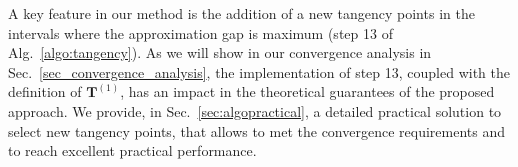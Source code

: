 \documentclass[review]{elsarticle}
\newcommand{\Ic}{\mathcal{I}}
\newcommand{\bN}{\mathbb{N}}
\newcommand{\victor}[1]{\textcolor{blue}{\textbf{[{\em VICTOR SAYS}: #1]}}}
\begin{document}

\newpage

	
A key feature in our method is the addition of a new tangency points in the intervals where the approximation gap is maximum (step 13 of Alg.~\ref{algo:tangency}). As we will show in our convergence analysis in Sec.~\ref{sec_convergence_analysis}, the implementation of step 13, coupled with the definition of $\mathbf{T}^{(1)}$, has an impact in the theoretical guarantees of the proposed approach. We provide, in Sec.~\ref{sec:algopractical}, a detailed practical solution to select new tangency points, that allows to met the convergence requirements and to reach excellent practical performance. 

\end{document}
